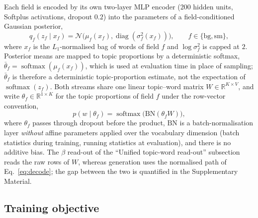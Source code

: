 \documentclass[Journal,letterpaper]{ascelike-new}
\begin{document}
Each field is encoded by its own two-layer MLP encoder (200 hidden units, Softplus activations,
dropout $0.2$) into the parameters of a field-conditioned Gaussian posterior,
\begin{equation}
q_f(z_f\mid x_f)=\mathcal N\big(\mu_f(x_f),\operatorname{diag}(\sigma_f^2(x_f))\big),
\qquad f\in\{\mathrm{bg},\mathrm{sm}\},
\end{equation}
where $x_f$ is the $L_1$-normalised bag of words of field $f$ and $\log\sigma_f^2$ is capped at
$2$. Posterior means are mapped to topic proportions by a deterministic softmax,
$\bar\theta_f=\operatorname{softmax}(\mu_f(x_f))$, which is used at evaluation time in place of
sampling; $\bar\theta_f$ is therefore a deterministic topic-proportion estimate, not the
expectation of $\operatorname{softmax}(z_f)$. Both streams share one linear topic--word matrix
$W\in\mathbb{R}^{K\times V}$, and write $\theta_f\in\mathbb{R}^{1\times K}$ for the topic
proportions of field $f$ under the row-vector convention,
\begin{equation}
p(w\mid\theta_f)=\operatorname{softmax}\!\big(\mathrm{BN}(\theta_f W)\big),
\label{eq:decode}
\end{equation}
where $\theta_f$ passes through dropout before the product, $\mathrm{BN}$ is a batch-normalisation
layer \emph{without} affine parameters applied over the vocabulary dimension (batch statistics
during training, running statistics at evaluation), and there is no additive bias. The $\beta$
read-out of the ``Unified topic-word read-out'' subsection reads the raw rows of $W$, whereas generation uses the
normalised path of Eq.~\eqref{eq:decode}; the gap between the two is quantified in the
Supplementary Material.

\subsection{Training objective}
\end{document}

